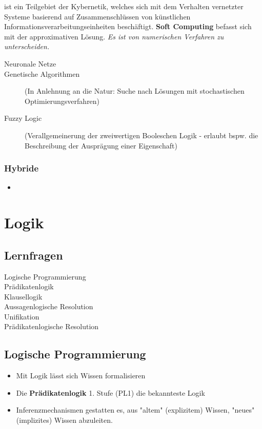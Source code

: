 \documentclass[runningheads]{llncs}
\begin{document}
ist ein Teilgebiet der Kybernetik, welches sich mit dem Verhalten vernetzter Systeme basierend auf Zusammenschlüssen von künstlichen Informationsverarbeitungseinheiten beschäftigt. \textbf{Soft Computing} befasst sich mit der approximativen Lösung. \textit{Es ist von numerischen Verfahren zu unterscheiden.}

\begin{description}
    \item[ Neuronale Netze]
    \item[ Genetische Algorithmen ] (In Anlehnung an die Natur: Suche nach Lösungen mit stochastischen Optimierungsverfahren)
    \item[ Fuzzy Logic ] (Verallgemeinerung der zweiwertigen Booleschen Logik - erlaubt bspw. die Beschreibung der Ausprägung einer Eigenschaft)
\end{description}

\subsubsection{Hybride}

\begin{itemize}
    \item 
\end{itemize}

\section{Logik}

\subsection{Lernfragen}

\begin{description}
    \item[Logische Programmierung] 
    \item[Prädikatenlogik]
    \item[Klausellogik]
    \item[Aussagenlogische Resolution]    
    \item[Unifikation] 
    \item[Prädikatenlogische Resolution] 
\end{description}

\subsection{Logische Programmierung}
\begin{itemize}
    \item Mit Logik lässt sich Wissen formalisieren
    \item Die \textbf{Prädikatenlogik} 1. Stufe (PL1) die bekannteste Logik
    \item Inferenzmechanismen gestatten es, aus "altem" (explizitem) Wissen, "neues" (implizites) Wissen abzuleiten.
\end{itemize}
\end{document}
